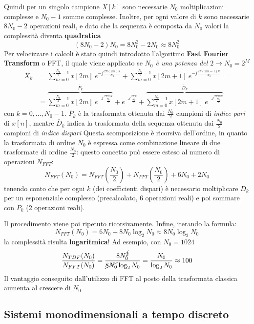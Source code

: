 \documentclass[
]{article}
\begin{document}
\begin{enumerate}
  Quindi per un singolo campione \(X[k]\) sono necessarie \(N_0\)
  moltiplicazioni complesse e \(N_0 -1\) somme complesse. Inoltre, per
  ogni valore di \(k\) sono necessarie \(8N_0 -2\) operazioni reali, e
  dato che la sequenza è composta da \(N_0\) valori la complessità
  diventa \textbf{quadratica} \[
  (8N_0 -2)N_0 = 8N_{0}^{2} -2N_0 \approx 8N_{0}^2
  \] Per velocizzare i calcoli è stato quindi introdotto l'algoritmo
  \textbf{Fast Fourier Transform} o FFT, il quale viene applicato se
  \emph{\(N_0\) è una potenza del \(2 \to N_0 = 2^{M}\)} \begin{align*}
  \overline{X}_k &= \sum_{m=0}^{\frac{N_0}{2}-1} x[2m]\ e^{-j\frac{2\pi(2m)k}{N_0}} + \sum_{m=0}^{\frac{N_0}{2}-1} x[2m+1] \ e^{-j\frac{2\pi(2m-1)k}{N_0}}= \\
  & = \overbrace{\sum_{m=0}^{\frac{N_0}{2}-1} x[2m]\ e^{-j\frac{2\pi mk}{\frac{N_0}{2}}}}^{\overline{P}_k}+e^{-j\frac{2\pi k}{\frac{N_0}{2}}} + \overbrace{\sum_{m=0}^{\frac{N_0}{2}-1} x[2m+1] \ e^{-j\frac{2\pi mk}{\frac{N_0}{2}}}}^{\overline{D}_k}
  \end{align*} con \(k= 0, \dots , N_0 -1\). \(\overline{P}_k\) è la
  trasformata ottenuta dai \(\frac{N_0}{2}\) campioni di \emph{indice
  pari} di \(x[n]\), mentre \(\overline{D}_k\) indica la trasformata
  della sequenza ottenuta dai \(\frac{N_0}{2}\) campioni di \emph{indice
  dispari} Questa scomposizione è ricorsiva dell'ordine, in quanto la
  trasformata di ordine \(N_0\) è espressa come combinazione lineare di
  due trasformate di ordine \(\frac{N_0}{2}\): questo concetto può
  essere esteso al numero di operazioni \(N_{FFT}\): \[
  N_{FFT}(N_0)=N_{FFT}(\frac{N_0}{2})+N_{FFT}(\frac{N_0}{2})+6N_0 + 2N_0
  \] tenendo conto che per ogni \(k\) (dei coefficienti dispari) è
  necessario moltiplicare \(D_k\) per un esponenziale complesso
  (precalcolato, 6 operazioni reali) e poi sommare con \(P_k\) (2
  operazioni reali).

  Il procedimento viene poi ripetuto ricorsivamente. Infine, iterando la
  formula: \[
  N_{FFT}(N_0) = 6N_0 + 8N_0\log_2 N_0 \approx 8N_0 \log_2 N_0
  \] la complessità risulta \textbf{logaritmica}! Ad esempio, con
  \(N_0=1024\) \[
  \frac{N_{TDF}(N_0)}{N_{FFT}(N_0)} = \frac{8N_{0}^{\cancel{2}}}{\cancel{8N_0}\log_2 N_0} = \frac{N_0}{\log_2 N_0} \approx 100
  \] Il vantaggio conseguito dall'utilizzo di FFT al posto della
  trasformata classica aumenta al crescere di \(N_0\)
\end{enumerate}

\subsection{Sistemi monodimensionali a tempo
discreto}\label{sistemi-monodimensionali-a-tempo-discreto}
\end{document}
